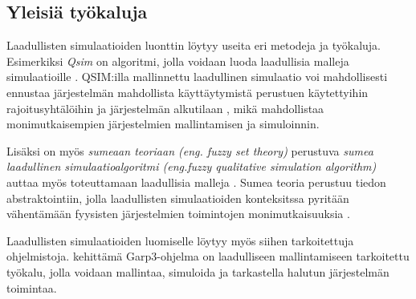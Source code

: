 \documentclass[utf8]{gradu3}
\begin{document}
\subsection{Yleisiä työkaluja}
\begin{comment}
Työkalujen nimet eivät juuri kerro niitä tuntemattomille. Pystytkö kuvaamaan enemmän strategieoita ja lähestymistapoja ymmärrettävällä tavalla. 

Käytännössä kai loppupelissä tietokone ajaa konkreettista määrällisät mallia konkreettisilla parametreilla. Mitä työkaluja tämän tason päällä on, jotta käyttäjälle syntyy näkymä laadullisemmastalähestymistavasta 8esim jos syöte on intervalleja tarkkojen arvojen sijaan, ohjelmisto haarukoi lopputuloksen ääriarvot kaikilla parametrikombinaatioilla tai antaa erilaisen tavan kuvata riippuvuuksia (smeat kuvaukset).
\end{comment}
Laadullisten simulaatioiden luonttin löytyy useita eri metodeja ja työkaluja.
Esimerkiksi \textit{Qsim} on algoritmi, jolla voidaan luoda laadullisia malleja simulaatioille
\parencite{kuipers1986qualitative}. 
QSIM:illa mallinnettu laadullinen simulaatio voi mahdollisesti ennustaa 
järjestelmän mahdollista käyttäytymistä perustuen käytettyihin rajoitusyhtälöihin 
ja järjestelmän alkutilaan \parencite{kuipers1986qualitative}, mikä mahdollistaa
monimutkaisempien järjestelmien mallintamisen ja simuloinnin.

Lisäksi on myös \textit{sumeaan teoriaan (eng. fuzzy set theory)} 
perustuva \textit{sumea laadullinen simulaatioalgoritmi 
(eng.fuzzy qualitative simulation algorithm)} 
auttaa myös toteuttamaan laadullisia malleja \parencite{shen1993fuzzy}.
Sumea teoria perustuu tiedon abstraktointiin, jolla laadullisten simulaatioiden
konteksitssa pyritään vähentämään fyysisten järjestelmien toimintojen monimutkaisuuksia
\parencite{shen1993fuzzy}.

Laadullisten simulaatioiden luomiselle löytyy myös siihen tarkoitettuja ohjelmistoja.
\textcite{bredeweg2007garp3} kehittämä Garp3-ohjelma on laadulliseen 
mallintamiseen tarkoitettu työkalu, jolla voidaan mallintaa, simuloida ja
tarkastella halutun järjestelmän toimintaa.

\begin{comment}
\subsection{Ongelmat}
\textcite{soundQualSimImpossible} mukaan täydellinen laadullinen simulaatio on mahdotonta.
Tutkimus keskittyy suurimmin osin QSIM-algoritmin kritiikkiin, mutta \textcite{soundQualSimImpossible} esittivät myös yleisempiä ongelmia laadulliseen simulaatioon, kuten tutkijoilta puuttuu usein täydellinen tieto muotoillakseen tarkkoja numeerisia yhtälöitä ja laadullisessa päättelyssä voidaan käyttää heikkoja esityksiä epätäydellisten järjestelmien mallintamiseen.
\end{comment}
\end{document}
